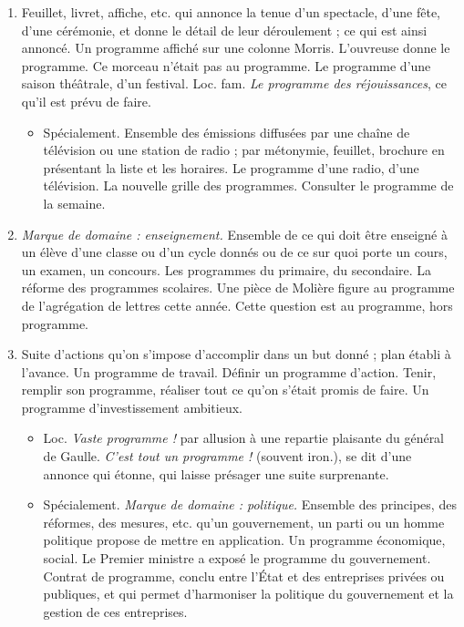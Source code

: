 \begin{graybox}
    \begin{enumerate}
        \item Feuillet, livret, affiche, etc. qui annonce la tenue d'un
        spectacle, d'une fête, d'une cérémonie, et donne le détail de leur
        déroulement ; ce qui est ainsi annoncé. Un programme affiché sur une
        colonne Morris. L'ouvreuse donne le programme. Ce morceau n'était pas
        au programme. Le programme d'une saison théâtrale, d'un festival.
        Loc. fam. \textit{Le programme des réjouissances}, ce qu'il est prévu
        de faire.
        \begin{itemize}
            \item Spécialement. Ensemble des émissions diffusées par une chaîne
            de télévision ou une station de radio ; par métonymie, feuillet,
            brochure en présentant la liste et les horaires. Le programme d'une
            radio, d'une télévision. La nouvelle grille des programmes.
            Consulter le programme de la semaine.
        \end{itemize}

        \item \textit{Marque de domaine : enseignement.} Ensemble de ce qui
        doit être enseigné à un élève d'une classe ou d'un cycle donnés ou de
        ce sur quoi porte un cours, un examen, un concours. Les programmes du
        primaire, du secondaire. La réforme des programmes scolaires. Une
        pièce de Molière figure au programme de l'agrégation de lettres cette
        année. Cette question est au programme, hors programme.

        \item Suite d'actions qu'on s'impose d'accomplir dans un but donné ;
        plan établi à l'avance. Un programme de travail. Définir un programme
        d'action. Tenir, remplir son programme, réaliser tout ce qu'on s'était
        promis de faire. Un programme d'investissement ambitieux.
        \begin{itemize}
            \item Loc. \textit{Vaste programme !} par allusion à une repartie
            plaisante du général de Gaulle. \textit{C'est tout un programme !}
            (souvent iron.), se dit d'une annonce qui étonne, qui laisse
            présager une suite surprenante.

            \item Spécialement. \textit{Marque de domaine : politique.}
            Ensemble des principes, des réformes, des mesures, etc. qu'un
            gouvernement, un parti ou un homme politique propose de mettre en
            application. Un programme économique, social. Le Premier ministre
            a exposé le programme du gouvernement. Contrat de programme,
            conclu entre l'État et des entreprises privées ou publiques, et
            qui permet d'harmoniser la politique du gouvernement et la gestion
            de ces entreprises.


\end{itemize}
\end{enumerate}
\end{graybox}
